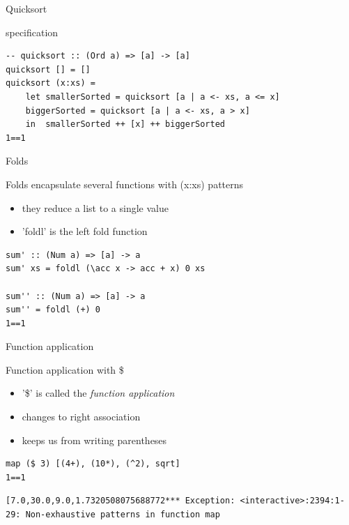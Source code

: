 \documentclass[presetation]{beamer}
\begin{document}
\begin{frame}[fragile,label={sec:org87c1bc1}]{Quicksort}
 \begin{block}{specification}
\begin{verbatim}
-- quicksort :: (Ord a) => [a] -> [a]  
quicksort [] = []  
quicksort (x:xs) =   
    let smallerSorted = quicksort [a | a <- xs, a <= x]  
	biggerSorted = quicksort [a | a <- xs, a > x]  
    in  smallerSorted ++ [x] ++ biggerSorted  
1==1
\end{verbatim}
\end{block}
\end{frame}
\begin{frame}[fragile,label={sec:orgfd12325}]{Folds}
 \begin{block}{Folds encapsulate several functions with (x:xs) patterns}
\begin{itemize}
\item they reduce a list to a single value
\item 'foldl' is the left fold function
\end{itemize}
\begin{verbatim}
sum' :: (Num a) => [a] -> a
sum' xs = foldl (\acc x -> acc + x) 0 xs

sum'' :: (Num a) => [a] -> a
sum'' = foldl (+) 0
1==1
\end{verbatim}
\end{block}
\end{frame}

\begin{frame}[fragile,label={sec:org0147a91}]{Function application}
 \begin{block}{Function application with \$}
\begin{itemize}
\item '\$' is called the \emph{function application}
\item changes to right association
\item keeps us from writing parentheses
\end{itemize}

\begin{verbatim}
map ($ 3) [(4+), (10*), (^2), sqrt]
1==1
\end{verbatim}

\begin{verbatim}
[7.0,30.0,9.0,1.7320508075688772*** Exception: <interactive>:2394:1-29: Non-exhaustive patterns in function map
\end{verbatim}
\end{block}
\end{frame}
\end{document}
